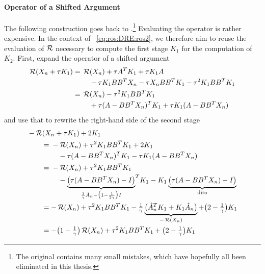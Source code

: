 \paragraph{\Riccati Operator of a Shifted Argument}

The following construction goes back to \cite{Mena2007,MPIMD12-13}.\footnote{%
  The original contains many small mistakes,
  which have hopefully all been eliminated in this thesis.
}
Evaluating the \Riccati operator is rather expensive.
In the context of ~\eqref{eq:ros:DRE:ros2},
we therefore aim to reuse the evaluation of $\operatorname{\mathcal R}$ necessary to compute the first stage $K_1$
for the computation of $K_2$.
First, expand the \Riccati operator of a shifted argument
\begin{subequations}
\begin{align}
  \Ricc(X_n + \tau K_1)
  &= \begin{multlined}[t]
    \Ricc(X_n) + \tau A^\T K_1 + \tau K_1 A \\
    - \tau K_1 BB^\T X_n - \tau X_n BB^\T K_1 - \tau^2 K_1 BB^\T K_1
  \end{multlined} \\
  &= \begin{multlined}[t]
    \Ricc(X_n) - \tau^2 K_1 BB^\T K_1 \\
    + \tau(A - BB^\T X_n)^\T K_1 + \tau K_1 (A - BB^\T X_n)
  \end{multlined}
\end{align}
\end{subequations}
and use that to rewrite the right-hand side of the second stage
\begin{subequations}
\begin{align}
  \MoveEqLeft
  -\Ricc(X_n + \tau K_1) + 2K_1
  \nonumber \\
  &= \begin{multlined}[t]
    -\Ricc(X_n) + \tau^2 K_1 BB^\T K_1 + 2K_1 \\
    - \tau(A - BB^\T X_n)^\T K_1 - \tau K_1 (A - BB^\T X_n)
  \end{multlined} \\
  &= \begin{multlined}[t]
    -\Ricc(X_n) + \tau^2 K_1 BB^\T K_1 \\
    - \underbrace{
      \big(\tau(A - BB^\T X_n) - I\big)
    }_{\frac{1}{\gamma} \hat{A}_n - \big( 1-\frac{1}{2\gamma} \big) I}
    \!{\vphantom{\big(}}^\T
    K_1
    - K_1
    \underbrace{
      \big(\tau(A - BB^\T X_n) - I\big)
    }_{\text{dito}}
  \end{multlined} \\
  &=
  -\Ricc(X_n) + \tau^2 K_1 BB^\T K_1
  -\tfrac{1}{\gamma}
  \underbrace{
    \big( \hat{A}_n^\T K_1 + K_1 \hat{A}_n \big)
  }_{-\Ricc(X_n)}
  + \big( 2-\tfrac{1}{\gamma} \big) K_1 \\
  &= -\big(1-\tfrac{1}{\gamma}\big) \Ricc(X_n)
  + \tau^2 K_1 BB^\T K_1
  + \big( 2-\tfrac{1}{\gamma} \big) K_1
\end{align}
\end{subequations}
